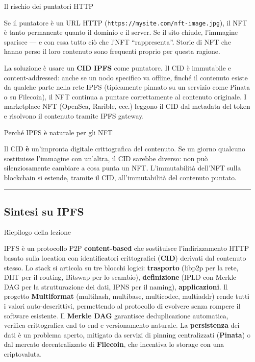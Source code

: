 \documentclass[
  italian,
  openany]{book}
\begin{document}
\begin{calloutwarning}{Il rischio dei puntatori HTTP}

Se il puntatore è un URL HTTP
(\texttt{https://mysite.com/nft-image.jpg}), il NFT è tanto permanente
quanto il dominio e il server. Se il sito chiude, l'immagine sparisce
--- e con essa tutto ciò che l'NFT ``rappresenta''. Storie di NFT che
hanno perso il loro contenuto sono frequenti proprio per questa ragione.

\end{calloutwarning}

La soluzione è usare un \textbf{CID IPFS} come puntatore. Il CID è
immutabile e content-addressed: anche se un nodo specifico va offline,
finché il contenuto esiste da qualche parte nella rete IPFS (tipicamente
pinnato su un servizio come Pinata o su Filecoin), il NFT continua a
puntare correttamente al contenuto originale. I marketplace NFT
(OpenSea, Rarible, ecc.) leggono il CID dal metadata del token e
risolvono il contenuto tramite IPFS gateway.

\begin{callouttip}{Perché IPFS è naturale per gli NFT}

Il CID \textbf{è} un'impronta digitale crittografica del contenuto. Se
un giorno qualcuno sostituisse l'immagine con un'altra, il CID sarebbe
diverso: non può silenziosamente cambiare a cosa punta un NFT.
L'immutabilità dell'NFT sulla blockchain si estende, tramite il CID,
all'immutabilità del contenuto puntato.

\end{callouttip}

\begin{center}\rule{0.5\linewidth}{0.5pt}\end{center}

\subsection{Sintesi su IPFS}\label{sintesi-su-ipfs}

\begin{calloutnote}{Riepilogo della lezione}

IPFS è un protocollo P2P \textbf{content-based} che sostituisce
l'indirizzamento HTTP basato sulla location con identificatori
crittografici (\textbf{CID}) derivati dal contenuto stesso. Lo stack si
articola su tre blocchi logici: \textbf{trasporto} (libp2p per la rete,
DHT per il routing, Bitswap per lo scambio), \textbf{definizione} (IPLD
con Merkle DAG per la strutturazione dei dati, IPNS per il naming),
\textbf{applicazioni}. Il progetto \textbf{Multiformat} (multihash,
multibase, multicodec, multiaddr) rende tutti i valori auto-descrittivi,
permettendo al protocollo di evolvere senza rompere il software
esistente. Il \textbf{Merkle DAG} garantisce deduplicazione automatica,
verifica crittografica end-to-end e versionamento naturale. La
\textbf{persistenza} dei dati è un problema aperto, mitigato da servizi
di pinning centralizzati (\textbf{Pinata}) o dal mercato decentralizzato
di \textbf{Filecoin}, che incentiva lo storage con una criptovaluta.

\end{calloutnote}
\end{document}
